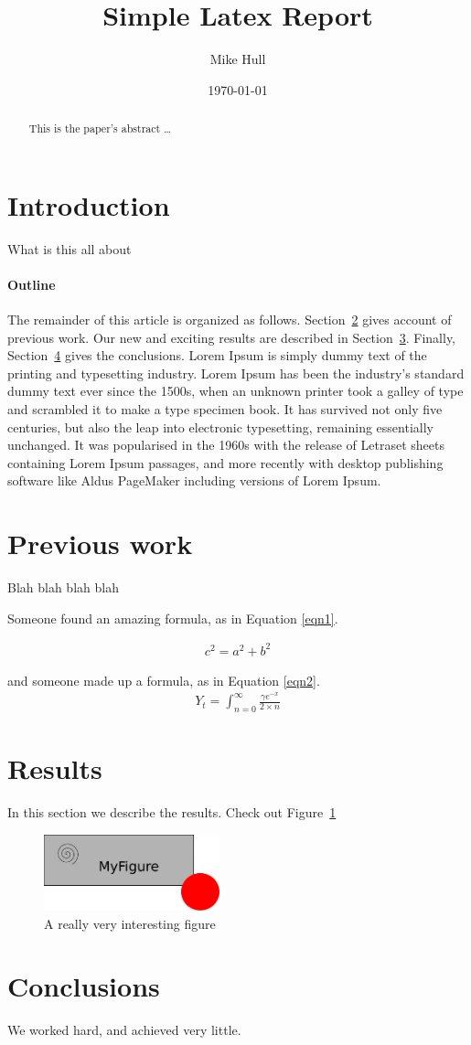 \documentclass[12pt]{article}
\title{Simple Latex Report}
\author{
       Mike Hull
}
\date{\today}
\begin{document}
\maketitle

\begin{abstract}
This is the paper's abstract \ldots
\end{abstract}

\section{Introduction}
What is this all about 

\paragraph{Outline}
The remainder of this article is organized as follows.
Section~\ref{previous work} gives account of previous work.
Our new and exciting results are described in Section~\ref{results}.
Finally, Section~\ref{conclusions} gives the conclusions.
Lorem Ipsum is simply dummy text of the printing and typesetting industry. Lorem Ipsum has been the industry's standard dummy text ever since the 1500s, when an unknown printer took a galley of type and scrambled it to make a type specimen book. It has survived not only five centuries, but also the leap into electronic typesetting, remaining essentially unchanged. It was popularised in the 1960s with the release of Letraset sheets containing Lorem Ipsum passages, and more recently with desktop publishing software like Aldus PageMaker including versions of Lorem Ipsum.

\section{Previous work}
\label{previous work}
Blah blah blah blah

Someone found an amazing formula, as in Equation \ref{eqn1}.

\begin{eqnarray}
c^2 = a^2 + b^2
\label{eqn1}
\end{eqnarray}

and someone made up a formula, as in Equation \ref{eqn2}.
\begin{eqnarray}
Y_t = \int^\infty_{n=0} \frac{\gamma e^{-x}}{2 \times n}
\label{eqn2}
\end{eqnarray}

\section{Results}
\label{results}
In this section we describe the results. Check out Figure~\ref{fig1}

\begin{figure}[h!]
\centering
\includegraphics[width=2in]{drawing.pdf}
\caption{A really very interesting figure}
\label{fig1}
\end{figure}

\section{Conclusions}\label{conclusions}
We worked hard, and achieved very little.
\end{document}
